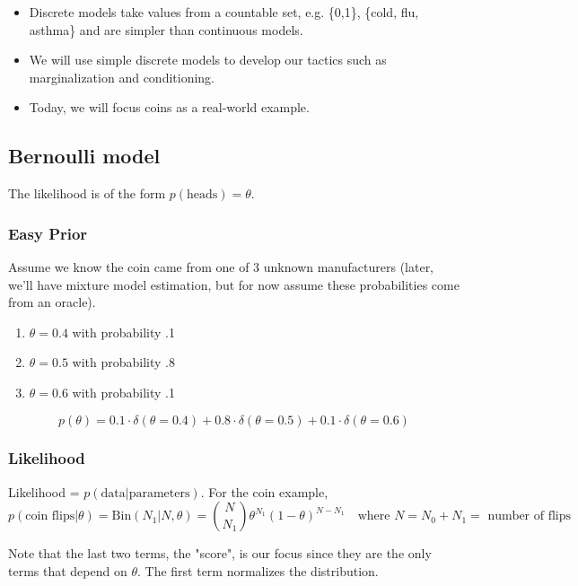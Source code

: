 \documentclass{article}
\begin{document}

\begin{itemize}
\item Discrete models take values from a countable set, e.g. \{0,1\}, \{cold, flu, asthma\} and are simpler than continuous models.
\item We will use simple discrete models to develop our tactics such as marginalization and conditioning. 
\item Today, we will focus coins as a real-world example.
\end{itemize}

\subsection{Bernoulli model}
The likelihood is of the form $p(\text{heads}) = \theta$.

\subsubsection*{Easy Prior}
Assume we know the coin came from one of 3 unknown manufacturers (later, we'll have mixture model estimation, but for now assume these probabilities come from an oracle).
\begin{enumerate}
\item $\theta = 0.4$ with probability .1
\item $\theta = 0.5$ with probability .8
\item $\theta = 0.6$ with probability .1
\end{enumerate}

$$p(\theta) = 0.1 \cdot \delta(\theta = 0.4)  + 0.8 \cdot \delta(\theta = 0.5) + 0.1 \cdot \delta(\theta = 0.6)$$

\subsubsection*{Likelihood}
Likelihood = $p(\text{data}|\text{parameters})$. For the coin example, 
$$p(\text{coin flips}|\theta) = \textrm{Bin}(N_1 | N, \theta) = {N \choose N_1} \theta^{N_1} (1-\theta)^{N-N_1} \quad \text{where $N = N_0 + N_1 =$ number of flips}$$

\noindent Note that the last two terms, the "score", is our focus since they are the only terms that depend on $\theta$. The first term normalizes the distribution.
\end{document}

